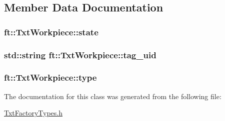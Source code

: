 \subsection{Member Data Documentation}
\subsubsection[{\texorpdfstring{state}{state}}]{ ft\+::\+Txt\+Workpiece\+::state}\hypertarget{classft_1_1_txt_workpiece_ac252dfab889507a20c74dd8a1b24fe66}{}\label{classft_1_1_txt_workpiece_ac252dfab889507a20c74dd8a1b24fe66}
\subsubsection[{\texorpdfstring{tag\+\_\+uid}{tag_uid}}]{\setlength{\rightskip}{0pt plus 5cm}std\+::string ft\+::\+Txt\+Workpiece\+::tag\+\_\+uid}\hypertarget{classft_1_1_txt_workpiece_a769f66288219e6064b61feae0e8b7276}{}\label{classft_1_1_txt_workpiece_a769f66288219e6064b61feae0e8b7276}
\subsubsection[{\texorpdfstring{type}{type}}]{ ft\+::\+Txt\+Workpiece\+::type}\hypertarget{classft_1_1_txt_workpiece_a9bddfb2e5f00c930f9c2967d224c6c1f}{}\label{classft_1_1_txt_workpiece_a9bddfb2e5f00c930f9c2967d224c6c1f}


The documentation for this class was generated from the following file\+:\begin{DoxyCompactItemize}
\item 
\hyperlink{_txt_factory_types_8h}{Txt\+Factory\+Types.\+h}\end{DoxyCompactItemize}
